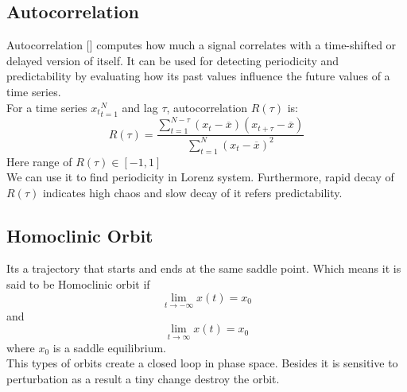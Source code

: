 \documentclass[%
reprint,
amsmath,amssymb,
aps,
floatfix,
]{revtex4-2}
\begin{document}
	\subsection{Autocorrelation}
	Autocorrelation [] computes how much a signal correlates with a time-shifted or delayed version of  itself. It can be used for detecting periodicity and predictability by evaluating how its past values influence the future values of a time series.\\
	For a time series ${x_t}_{t=1}^N$ and lag $\tau$, autocorrelation $R(\tau)$ is:
	\begin{equation}
		R(\tau) = \frac{\sum_{t=1}^{N-\tau} (x_t - \overline{x}) (x_{t+\tau} - \overline{x})}{\sum_{t=1}^{N} (x_t - \overline{x})^2}
	\end{equation}
	Here range of $R(\tau) \in [-1,1]$ \\
	We can use it to find periodicity in Lorenz system. Furthermore, rapid decay of $R(\tau)$ indicates high chaos and slow decay of it refers predictability.\\
	\subsection{Homoclinic Orbit}
	Its a trajectory that starts and ends at the same saddle point.
	Which means it is said to be Homoclinic orbit if\\
	\begin{equation}
		\lim_{t\to -\infty} x(t) = x_0
	\end{equation}
	and
	\begin{equation}
		\lim_{t\to \infty} x(t) = x_0
	\end{equation}
	where $x_0$ is a saddle equilibrium.\\
	This types of orbits create a closed loop in phase space. Besides it is sensitive to perturbation as a result a tiny change destroy the orbit.
\end{document}
